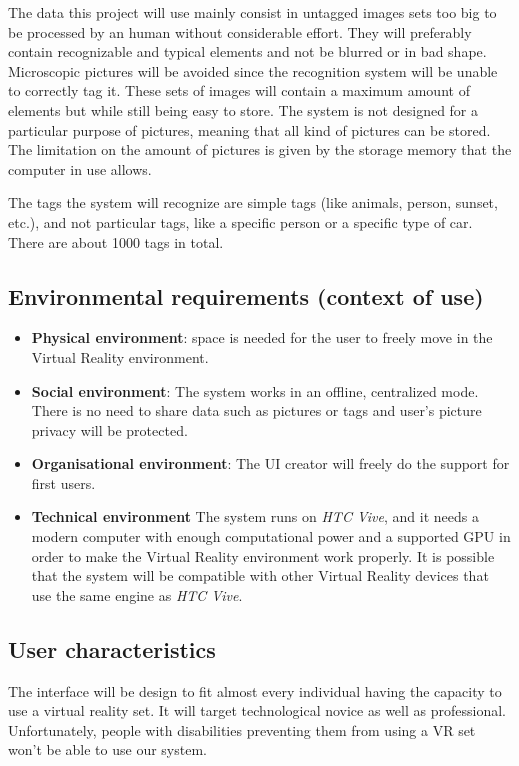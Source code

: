 \documentclass[11pt,a4paper]{article}
\begin{document}
The data this project will use mainly consist in untagged images sets too big to be processed by an human without considerable effort. They will preferably contain recognizable  and typical elements and not be blurred or in bad shape. Microscopic pictures will be avoided since the recognition system will be unable to correctly tag it. These sets of images will contain a maximum amount of elements but while still being easy to store. 
The system is not designed for a particular purpose of pictures, meaning that all kind of pictures can be stored. The limitation on the amount of pictures is given by the storage memory that the computer in use allows.

The tags the system will recognize are simple tags (like animals, person, sunset, etc.), and not particular tags, like a specific person or a specific type of car. There are about 1000 tags in total.

\subsection{Environmental requirements (context of use)}

\begin{itemize}
\item \textbf{Physical environment}: space is needed for the user to freely move in the Virtual Reality environment.
\item \textbf{Social environment}: The system works in an offline, centralized mode. There is no need to share data such as pictures or tags and user's picture privacy will be protected.
\item \textbf{Organisational environment}: The UI creator will freely do the support for first users.
\item \textbf{Technical environment}
The system runs on \textit{HTC Vive}, and it needs a modern computer with enough computational power and a supported GPU in order to make the Virtual Reality environment work properly. 
It is possible that the system will be compatible with other Virtual Reality devices that use the same engine as \textit{HTC Vive}.
\end{itemize}


\subsection{User characteristics}

The interface will be design to fit almost every individual having the capacity to use  a virtual reality set. It will target technological novice as well as professional. Unfortunately, people with disabilities preventing them from using a VR set won't be able to use our system.
\end{document}
